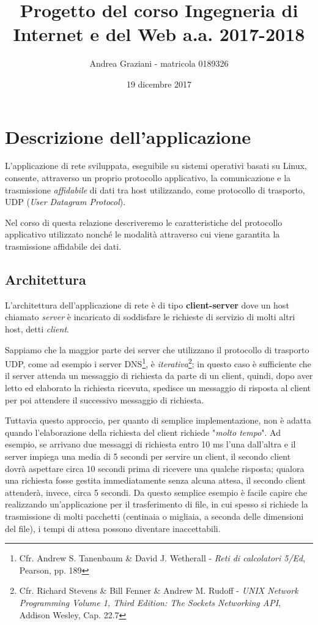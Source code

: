 \documentclass[10pt,a4paper, titlepage]{report}
\title{Progetto del corso Ingegneria di Internet e del Web a.a. 2017-2018}
\author{Andrea Graziani - matricola 0189326}
\date{19 dicembre 2017}
\begin{document}
\maketitle
\tableofcontents
\newpage

\chapter{Descrizione dell'applicazione}

L'applicazione di rete sviluppata, eseguibile su sistemi operativi basati su Linux, consente, attraverso un proprio protocollo applicativo, la comunicazione e la trasmissione \textit{affidabile} di dati tra host utilizzando, come protocollo di trasporto, UDP (\textit{User Datagram Protocol}). 

Nel corso di questa relazione descriveremo le caratteristiche del protocollo applicativo utilizzato nonché le modalità attraverso cui viene garantita la trasmissione affidabile dei dati.

\section{Architettura}

L'architettura dell'applicazione di rete è di tipo \textbf{client-server} dove un host chiamato \textit{server} è incaricato di soddisfare le richieste di servizio di molti altri host, detti \textit{client}.

Sappiamo che la maggior parte dei server che utilizzano il protocollo di trasporto UDP, come ad esempio i server DNS\footnote{Cfr. Andrew S. Tanenbaum \& David J. Wetherall - \textit{Reti di calcolatori 5/Ed}, Pearson, pp. 189}, è \textit{iterativa}\footnote{Cfr. Richard Stevens \& Bill Fenner \& Andrew M. Rudoff - \textit{UNIX Network Programming Volume 1, Third Edition: The Sockets Networking API}, Addison Wesley, Cap. 22.7}; in questo caso è sufficiente che il server attenda un messaggio di richiesta da parte di un client, quindi, dopo aver letto ed elaborato la richiesta ricevuta, spedisce un messaggio di risposta al client per poi attendere il successivo messaggio di richiesta. 

Tuttavia questo approccio, per quanto di semplice implementazione, non è adatta quando l'elaborazione della richiesta del client richiede "\textit{molto tempo}". Ad esempio, se arrivano due messaggi di richiesta entro 10 ms l'una dall'altra e il server impiega una media di 5 secondi per servire un client, il secondo client dovrà aspettare circa 10 secondi prima di ricevere una qualche risposta; qualora una richiesta fosse gestita immediatamente senza alcuna attesa, il secondo client attenderà, invece, circa 5 secondi. Da questo semplice esempio è facile capire che realizzando un'applicazione per il trasferimento di file, in cui spesso si richiede la trasmissione di molti pacchetti (centinaia o migliaia, a seconda delle dimensioni del file), i tempi di attesa possono diventare inaccettabili.
\end{document}
